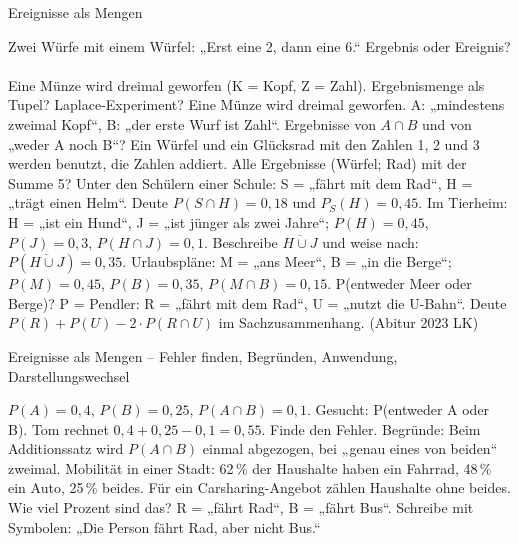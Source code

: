 \setcounter{aufgabe}{11}

\begin{aufgabe}{Ereignisse als Mengen}
\begin{teile}
\teil Zwei Würfe mit einem Würfel: „Erst eine 2, dann eine 6.“ Ergebnis oder Ereignis?\\ \\ 
\teil Eine Münze wird dreimal geworfen (K = Kopf, Z = Zahl). Ergebnismenge als Tupel? Laplace-Experiment?
\teil Eine Münze wird dreimal geworfen. A: „mindestens zweimal Kopf“, B: „der erste Wurf ist Zahl“. Ergebnisse von $A \cap B$ und von „weder A noch B“?
\teil Ein Würfel und ein Glücksrad mit den Zahlen 1, 2 und 3 werden benutzt, die Zahlen addiert. Alle Ergebnisse (Würfel; Rad) mit der Summe 5?
\teil Unter den Schülern einer Schule: S = „fährt mit dem Rad“, H = „trägt einen Helm“. Deute $P(S \cap H) = 0{,}18$ und $P_S(H) = 0{,}45$.
\teil Im Tierheim: H = „ist ein Hund“, J = „ist jünger als zwei Jahre“; $P(H) = 0{,}45$, $P(J) = 0{,}3$, $P(H \cap J) = 0{,}1$. Beschreibe $\overline{H \cup J}$ und weise nach: $P(\overline{H \cup J}) = 0{,}35$.
\teil Urlaubspläne: M = „ans Meer“, B = „in die Berge“; $P(M) = 0{,}45$, $P(B) = 0{,}35$, $P(M \cap B) = 0{,}15$. P(entweder Meer oder Berge)? P = \leerfeld
\teil Pendler: R = „fährt mit dem Rad“, U = „nutzt die U-Bahn“. Deute $P(R) + P(U) - 2 \cdot P(R \cap U)$ im Sachzusammenhang. \hfill (Abitur 2023 LK)
\end{teile}
\end{aufgabe}

\begin{aufgabe}{Ereignisse als Mengen – Fehler finden, Begründen, Anwendung, Darstellungswechsel}
\begin{teile}
\teil $P(A) = 0{,}4$, $P(B) = 0{,}25$, $P(A \cap B) = 0{,}1$. Gesucht: P(entweder A oder B). Tom rechnet $0{,}4 + 0{,}25 - 0{,}1 = 0{,}55$. Finde den Fehler.
\teil Begründe: Beim Additionssatz wird $P(A \cap B)$ einmal abgezogen, bei „genau eines von beiden“ zweimal.
\teil Mobilität in einer Stadt: 62\,\% der Haushalte haben ein Fahrrad, 48\,\% ein Auto, 25\,\% beides. Für ein Carsharing-Angebot zählen Haushalte ohne beides. Wie viel Prozent sind das? \leerfeld[\%]
\teil R = „fährt Rad“, B = „fährt Bus“. Schreibe mit Symbolen: „Die Person fährt Rad, aber nicht Bus.“
\end{teile}
\end{aufgabe}
